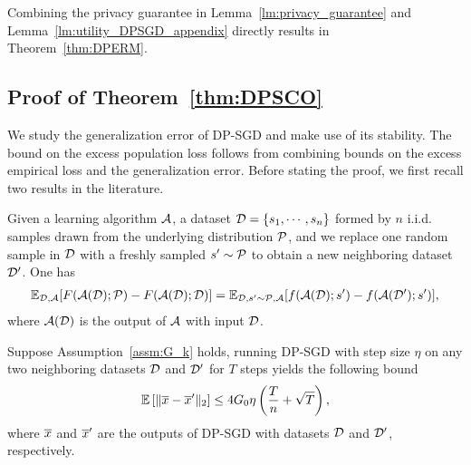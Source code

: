 Combining the privacy guarantee in Lemma~\ref{lm:privacy_guarantee} and Lemma~\ref{lm:utility_DPSGD_appendix} directly results in Theorem~\ref{thm:DPERM}.

\subsection{Proof of Theorem~\ref{thm:DPSCO}} \label{app:dpsco_proof}

We study the generalization error of DP-SGD and make use of its stability.
The bound on the excess population loss follows from combining bounds on the excess empirical loss and the generalization error. 
Before stating the proof, we first recall two results in the literature.

\begin{lemm}[{\cite[Lemma 7]{BE02}}]
\label{lm:stab_generalization_error}
Given a learning algorithm $\mathcal A$, a dataset $\mathcal D=\{s_1,\cdots,s_n\}$ formed by $n$ i.i.d. samples drawn from the underlying distribution $\mathcal P$, and we replace one random sample in $\mathcal D$ with a freshly sampled $s'\sim\mathcal P$ to obtain a new neighboring dataset $\mathcal D'$.
One has
\begin{align*}
    \mathbb{E}_{\mathcal D,\mathcal A}[F(\mathcal A(\mathcal D); \mathcal P)-F(\mathcal A(\mathcal D);\mathcal D)]=\mathbb{E}_{\mathcal D,s'\sim\mathcal P,\mathcal A}[f(\mathcal A(\mathcal D);s')-f(\mathcal A(\mathcal D');s')],
\end{align*}
where $\mathcal A(\mathcal D)$ is the output of $\mathcal A$ with input $\mathcal D$.
\end{lemm}

\begin{lemm}
\label{lm:stab_DPSGD}
Suppose Assumption~\ref{assm:G_k} holds, running DP-SGD with step size $\eta$ 
on any two neighboring datasets $\mathcal D$ and $\mathcal D'$ for $T$ steps yields the following bound
\begin{align*}
    \mathbb{E} \left[ \|\overline{x}-\overline{x}'\|_2 \right] \le 4 G_0 \eta\left(\frac{T}{n}+\sqrt{T}\right),
\end{align*}
where $\overline{x}$ and $\overline{x}'$ are the outputs of DP-SGD with datasets $\mathcal D$ and $\mathcal D'$, respectively.
\end{lemm}




